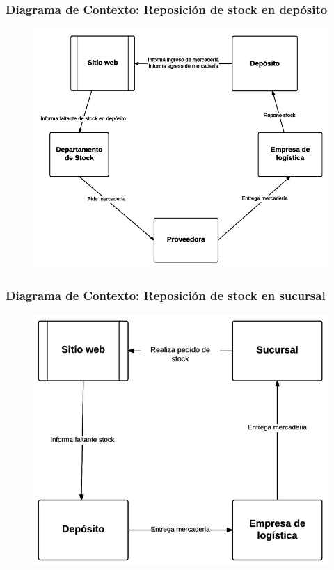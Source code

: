 \subsubsection{Diagrama de Contexto: Reposición de stock en depósito}
\begin{figure}[H]
  \includegraphics[width=\linewidth]{images/reposicion-stock-deposito.png}
\end{figure}

\clearpage
\subsubsection{Diagrama de Contexto: Reposición de stock en sucursal}
\begin{figure}[H]
  \includegraphics[width=\linewidth]{images/reposicion-stock-sucursal.png}
\end{figure}

